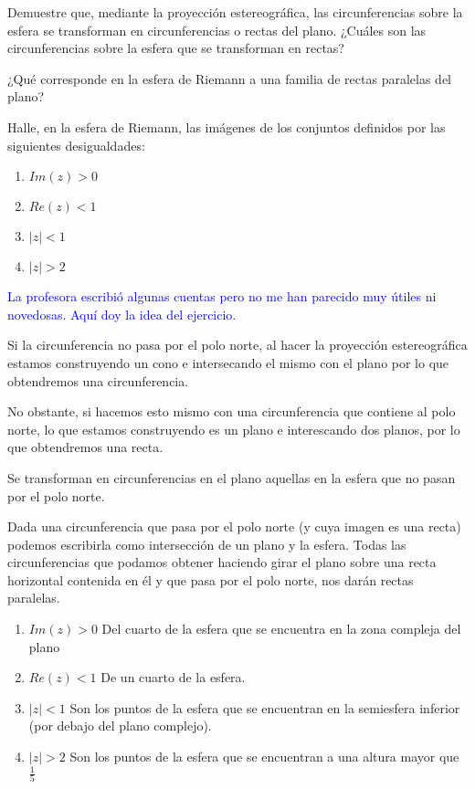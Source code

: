 \begin{problem}[2]
\ppart
Demuestre que, mediante la proyección estereográfica, las circunferencias sobre la esfera se transforman en circunferencias o rectas del plano. ¿Cuáles son las circunferencias sobre la esfera que se transforman en rectas?

\ppart
¿Qué corresponde en la esfera de Riemann a una familia de rectas paralelas del plano?

\ppart
Halle, en la esfera de Riemann, las imágenes de los conjuntos definidos por las siguientes desigualdades:
\begin{enumerate}
\item $Im(z) > 0$
\item $Re(z) < 1$
\item $|z| < 1$
\item $|z| > 2$
\end{enumerate}

\solution

\textcolor{blue}{La profesora escribió algunas cuentas pero no me han parecido muy útiles ni novedosas. Aquí doy la idea del ejercicio.}

\spart

Si la circunferencia no pasa por el polo norte, al hacer la proyección estereográfica estamos construyendo un cono e intersecando el mismo con el plano por lo que obtendremos una circunferencia.

No obstante, si hacemos esto mismo con una circunferencia que contiene al polo norte, lo que estamos construyendo es un plano e interescando dos planos, por lo que obtendremos una recta.

Se transforman en circunferencias en el plano aquellas en la esfera que no pasan por el polo norte.

\spart
Dada una circunferencia que pasa por el polo norte (y cuya imagen es una recta) podemos escribirla como intersección de un plano y la esfera. Todas las circunferencias que podamos obtener haciendo girar el plano sobre una recta horizontal contenida en él y que pasa por el polo norte, nos darán rectas paralelas.

\spart
\begin{enumerate}
\item $Im(z) > 0$
Del cuarto de la esfera que se encuentra en la zona compleja del plano

\item $Re(z) < 1$
De un cuarto de la esfera.

\item $|z| < 1$
Son los puntos de la esfera que se encuentran en la semiesfera inferior (por debajo del plano complejo).

\item $|z| > 2$
Son los puntos de la esfera que se encuentran a una altura mayor que $\frac{1}{5}$
\end{enumerate}

\end{problem}

